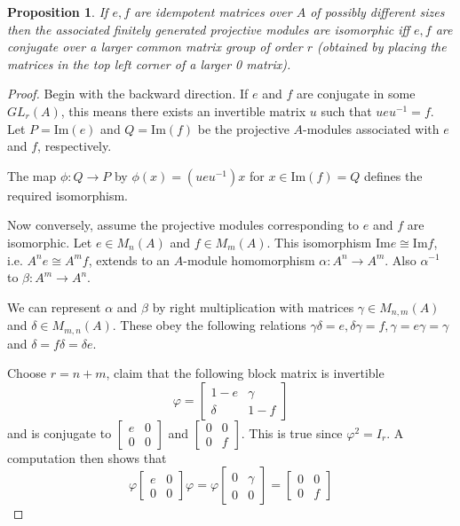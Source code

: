 \documentclass[12pt]{article}
\numberwithin{equation}{section}
\newcommand{\image}{{\mathrm{Im}}}
\newcounter{dummy} \numberwithin{dummy}{section}
\newtheorem{proposition}[dummy]{Proposition}
\begin{document}
	\begin{proposition}
		If $e, f $ are idempotent matrices over $A$ of possibly different sizes then the associated finitely generated projective modules are isomorphic iff $e,f $ are conjugate over a larger common matrix group of order $r$ (obtained by placing the matrices in the top left corner of a larger 0 matrix).
	\end{proposition}
	\begin{proof}
		Begin with the backward direction. If $e$ and $f$ are conjugate in some $GL_r(A)$, this means there exists an invertible matrix $u$ such that $u e u^{-1} = f$.  Let $P = \text{Im}(e)$ and $Q = \text{Im}(f)$ be the projective $A$-modules associated with $e$ and $f$, respectively. 
			
		The map $\phi: Q \to P$ by $\phi(x) = (ueu^{-1})x$ for $x\in \image (f) =Q$ defines the required isomorphism.
		
		Now conversely, assume the projective modules corresponding to $e$ and $f$ are isomorphic.  Let $e \in M_n(A)$ and $f \in M_m(A)$.  This isomorphism $\image e \cong \image f$, i.e. $A^n e \cong A^m f$, extends to an $A$-module homomorphism $\alpha \colon A^n \to A^m$. Also $\alpha^{-1} $ to $\beta \colon A^m \to A^n$. 
		
		We can represent $\alpha$ and $\beta$ by right multiplication with matrices $\gamma \in M_{n,m}(A)$ and $\delta \in M_{m,n}(A)$. These obey the following relations $\gamma \delta = e, \delta \gamma =f, \gamma=e\gamma=\gamma$ and $\delta = f \delta=\delta e$.
		
		Choose $r = n + m$, claim that the following block matrix is invertible 
		\[
		\varphi = \begin{bmatrix}
			1-e & \gamma  \\
			\delta & 1-f
		\end{bmatrix}
		\]
		and is conjugate to $\begin{bmatrix} e & 0 \\ 0 & 0 \end{bmatrix}$ and $\begin{bmatrix} 0 & 0 \\ 0 & f \end{bmatrix}$.  
		This is true since $\varphi^2=I_{r}$. A computation then shows that \[ \varphi \begin{bmatrix}
			e & 0 \\
			0 & 0
		\end{bmatrix} \varphi= \varphi  \begin{bmatrix}
		0 & \gamma \\
		0& 0
		\end{bmatrix} = \begin{bmatrix}
		0 & 0\\
		0& f
		\end{bmatrix}\]
		

\end{proof}
\end{document}
